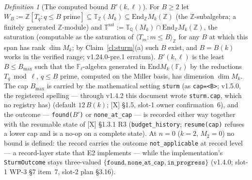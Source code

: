 \documentclass[11pt]{article}
\theoremstyle{remark}
\newtheorem{definition}[theorem]{Definition}
\newcommand{\F}{\mathbb{F}}
\newcommand{\Z}{\mathbb{Z}}
\newcommand{\Q}{\mathbb{Q}}
\newcommand{\End}{\mathrm{End}}
\newcommand{\Fl}{\F_\ell}
\newcommand{\T}{\mathbb{T}}
\begin{document}
\begin{definition}[The computed bound $B'(k,\ell)$]\label{def:bprime}
For $B\ge2$ let $W_B:=\Z[T_q:q\le B\text{ prime}]\subseteq\T_\Z(M_k)\subseteq\End_\Z M_k(\Z)$ (the
$\Z$-subalgebra; a finitely generated $\Z$-module) and $\T^{\mathrm{sat}}:=\T_\Q(M_k)\cap\End_\Z M_k(\Z)$,
the saturation (computable as the saturation of $\langle T_m:m\le B\rangle_\Z$ for any $B$ at which this span has rank $\dim M_k$; by Claim~\ref{cl:sturm}(a) such $B$ exist, and $B=B(k)$ works in the verified range; v1.24.0-pre.1 erratum).
$B'(k,\ell)$ is the least $B\le B_{\max}$ such that the $\Fl$-algebra generated in
$\End M_k(\Fl)$ by the reductions $T_q\bmod\ell$, $q\le B$ prime, computed on the Miller basis,
has dimension $\dim M_k$. The cap $B_{\max}$ is carried by the mathematical setting
\texttt{sturm} (as \texttt{cap=<B>}; v1.5.0, the registered spelling --- through v1.4.2 this
document wrote \texttt{sturm.cap}, which no registry has)
(default $12\,B(k)$; [X] \S1.5, slot-1 owner confirmation~6), and the outcome ---
\texttt{found($B'$)} or \texttt{none\_at\_cap} --- is recorded either way together with the
resumable state of [X] \S1.3.1 R3 (\texttt{budget\_history}; \texttt{resume(cap)} refuses a lower
cap and is a no-op on a complete state). At $n=0$ ($k=2$, $M_2=0$) no bound is defined: the
record carries the outcome \texttt{not\_applicable} at record level --- a record-layer state
that E2 implements --- while the implementation's \texttt{SturmOutcome} stays three-valued
$\{\texttt{found},\texttt{none\_at\_cap},\texttt{in\_progress}\}$ (v1.4.0; slot-1 WP-3 \S7
item~7, slot-2 plan \S3.16).
\end{definition}
\end{document}
